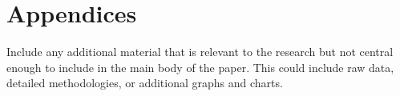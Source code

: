 \section{Appendices}
\label{sec:appendices}
Include any additional material that is relevant to the research but not central enough to include in the main body of the paper. This could include raw data, detailed methodologies, or additional graphs and charts.